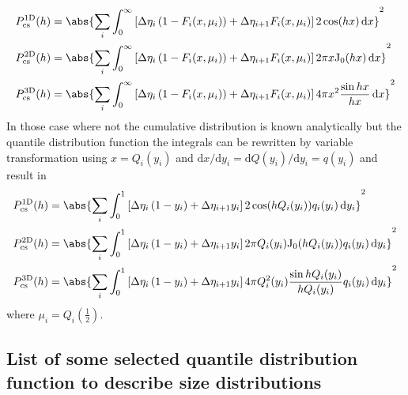 \begin{align}
  P_\textrm{cs}^\mathrm{1D}(h) & = \abs{\sum_i  \int_0^\infty \left[\Delta\eta_i\left(1-F_i(x,\mu_i)\right) +\Delta\eta_{i+1} F_i(x,\mu_i)\right] 2\cos (hx)\,\mathrm{d}x }^2 \\
  P_\textrm{cs}^\mathrm{2D}(h) & = \abs{\sum_i  \int_0^\infty \left[\Delta\eta_i\left(1-F_i(x,\mu_i)\right) +\Delta\eta_{i+1} F_i(x,\mu_i)\right] 2\pi x \textrm{J}_0(hx)\,\mathrm{d}x }^2 \\
  P_\textrm{cs}^\mathrm{3D}(h) & = \abs{\sum_i  \int_0^\infty \left[\Delta\eta_i\left(1-F_i(x,\mu_i)\right) +\Delta\eta_{i+1} F_i(x,\mu_i)\right] 4\pi x^2\frac{\sin hx}{hx}\,\mathrm{d}x }^2
\end{align}
In those case where not the cumulative distribution is known analytically but the quantile distribution function the integrals can be rewritten by variable transformation using $x=Q_i(y_i)$ and $\mathrm{d}x/\mathrm{d}y_i=\mathrm{d}Q(y_i)/\mathrm{d}y_i=q(y_i)$ and result in
\begin{align}
  P_\textrm{cs}^\mathrm{1D}(h) & = \abs{\sum_i  \int_0^1 \left[\Delta\eta_i\left(1-y_i\right) +\Delta\eta_{i+1} y_i\right] 2\cos (hQ_i(y_i))q_i(y_i)\,\mathrm{d}y_i }^2 \\
  P_\textrm{cs}^\mathrm{2D}(h) & = \abs{\sum_i  \int_0^1 \left[\Delta\eta_i\left(1-y_i\right) +\Delta\eta_{i+1} y_i\right] 2\pi Q_i(y_i) \textrm{J}_0(hQ_i(y_i))q_i(y_i)\,\mathrm{d}y_i }^2 \\
  P_\textrm{cs}^\mathrm{3D}(h) & = \abs{\sum_i  \int_0^1 \left[\Delta\eta_i\left(1-y_i\right) +\Delta\eta_{i+1} y_i\right] 4\pi Q_i^2(y_i)\frac{\sin hQ_i(y_i)}{hQ_i(y_i)}q_i(y_i)\,\mathrm{d}y_i }^2
\end{align}
where $\mu_i=Q_i\left(\frac12\right)$.


\subsection{List of some selected quantile distribution function to describe size distributions} ~\\

